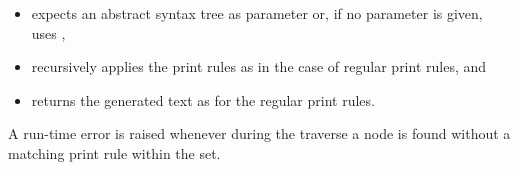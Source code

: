 \begin{itemize}
   \item expects an abstract syntax tree as parameter or,
      if no parameter is given, uses ,
   \item recursively applies the print rules as in the
      case of regular print rules, and
   \item returns the generated text as  for the
      regular print rules.
\end{itemize}

\noindent
A run-time error is raised whenever during the traverse a node
is found without a matching print rule within the set.

\begin{grammar}
      \produces {}  
	 \lextoken{\{} 
	 \lextoken{\}} \\
\end{grammar}

\endinput
